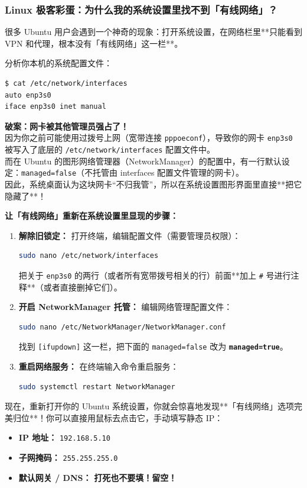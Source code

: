 \documentclass[12pt,a4paper]{ctexart}
\begin{document}
\subsubsection{Linux 极客彩蛋：为什么我的系统设置里找不到「有线网络」？}
很多 Ubuntu 用户会遇到一个神奇的现象：打开系统设置，在网络栏里**只能看到 VPN 和代理，根本没有「有线网络」这一栏**。

分析你本机的系统配置文件：
\begin{lstlisting}[style=terminal]
$ cat /etc/network/interfaces
auto enp3s0
iface enp3s0 inet manual
\end{lstlisting}

\textbf{破案：网卡被其他管理员强占了！} \\
因为你之前可能使用过拨号上网（宽带连接 \texttt{pppoeconf}），导致你的网卡 \texttt{enp3s0} 被写入了底层的 \texttt{/etc/network/interfaces} 配置文件中。 \\
而在 Ubuntu 的图形网络管理器（NetworkManager）的配置中，有一行默认设定：\texttt{managed=false}（不托管由 interfaces 配置文件管理的网卡）。 \\
因此，系统桌面认为这块网卡“不归我管”，所以在系统设置图形界面里直接**把它隐藏了**！

\textbf{让「有线网络」重新在系统设置里显现的步骤：}
\begin{enumerate}
    \item \textbf{解除旧锁定：} 打开终端，编辑配置文件（需要管理员权限）：
    \begin{lstlisting}[language=bash]
    sudo nano /etc/network/interfaces
    \end{lstlisting}
    把关于 \texttt{enp3s0} 的两行（或者所有宽带拨号相关的行）前面**加上 \texttt{\#} 号进行注释**（或者直接删掉它们）。
    \item \textbf{开启 NetworkManager 托管：} 编辑网络管理配置文件：
    \begin{lstlisting}[language=bash]
    sudo nano /etc/NetworkManager/NetworkManager.conf
    \end{lstlisting}
    找到 \texttt{[ifupdown]} 这一栏，把下面的 \texttt{managed=false} 改为 \textbf{\texttt{managed=true}}。
    \item \textbf{重启网络服务：} 在终端输入命令重启服务：
    \begin{lstlisting}[language=bash]
    sudo systemctl restart NetworkManager
    \end{lstlisting}
\end{enumerate}
现在，重新打开你的 Ubuntu 系统设置，你就会惊喜地发现**「有线网络」选项完美归位**！你可以直接用鼠标去点击它，手动填写静态 IP：
\begin{itemize}
    \item \textbf{IP 地址：} \texttt{192.168.5.10}
    \item \textbf{子网掩码：} \texttt{255.255.255.0}
    \item \textbf{默认网关 / DNS：} \textbf{打死也不要填！留空！}
\end{itemize}
\end{document}
